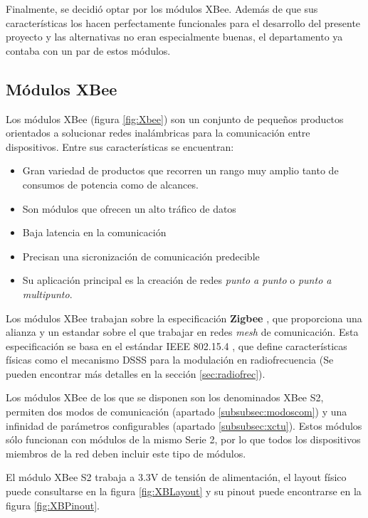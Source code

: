 Finalmente, se decidió optar por los módulos XBee. Además de que sus características los hacen perfectamente funcionales para el desarrollo del presente proyecto y las alternativas no eran especialmente buenas, el departamento ya contaba con un par de estos módulos.

\subsection{Módulos XBee}

Los módulos XBee \cite{Xbee:2019} (figura \ref{fig:Xbee}) son un conjunto de pequeños productos orientados a solucionar redes inalámbricas para la comunicación entre dispositivos. Entre sus características se encuentran:

\begin{itemize}
\item Gran variedad de productos que recorren un rango muy amplio tanto de consumos de potencia como de alcances.
\item Son módulos que ofrecen un alto tráfico de datos
\item Baja latencia en la comunicación
\item Precisan una sicronización de comunicación predecible
\item Su aplicación principal es la creación de redes \textit{punto a punto} o \textit{punto a multipunto}.
\end{itemize}

Los módulos XBee trabajan sobre la especificación \textbf{Zigbee} \cite{Zigbee:2019}, que proporciona una alianza y un estandar sobre el que trabajar en redes \textit{mesh} de comunicación. Esta especificación se basa en el estándar IEEE 802.15.4 \cite{IEEE:2007}, que define características físicas como el mecanismo DSSS para la modulación en radiofrecuencia (Se pueden encontrar más detalles en la sección \ref{sec:radiofrec}).

Los módulos XBee de los que se disponen son los denominados XBee S2\cite{XbeeS2:2007}, permiten dos modos de comunicación (apartado \ref{subsubsec:modoscom}) y una infinidad de parámetros configurables (apartado \ref{subsubsec:xctu}). Estos módulos sólo funcionan con módulos de la mismo Serie 2, por lo que todos los dispositivos miembros de la red deben incluir este tipo de módulos.

El módulo XBee S2 trabaja a 3.3V de tensión de alimentación, el layout físico puede consultarse en la figura \ref{fig:XBLayout} y su pinout puede encontrarse en la figura \ref{fig:XBPinout}.

